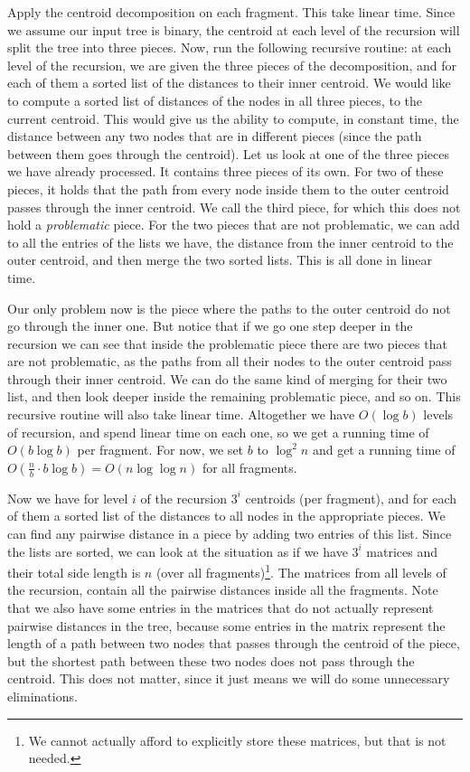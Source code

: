 \documentclass[11pt,a4paper]{article}
\theoremstyle{definition}
\theoremstyle{remark}
\begin{document}
Apply the centroid decomposition on each fragment. This take linear time. Since we assume our input tree is binary, the centroid at each level of the recursion will split the tree into three pieces. Now, run the following recursive routine: at each level of the recursion, we are given the three pieces of the decomposition, and for each of them a sorted list of the distances to their inner centroid. We would like to compute a sorted list of distances of the nodes in all three pieces, to the current centroid. This would give us the ability to compute, in constant time, the distance between any two nodes that are in different pieces (since the path between them goes through the centroid). Let us look at one of the three pieces we have already processed. It contains three pieces of its own. For two of these pieces, it holds that the path from every node inside them to the outer centroid passes through the inner centroid. We call the third piece, for which this does not hold a \textit{problematic} piece. For the two pieces that are not problematic, we can add to all the entries of the lists we have, the distance from the inner centroid to the outer centroid, and then merge the two sorted lists. This is all done in linear time.

Our only problem now is the piece where the paths to the outer centroid do not go through the inner one. But notice that if we go one step deeper in the recursion we can see that inside the problematic piece there are two pieces that are not problematic, as the paths from all their nodes to the outer centroid pass through their inner centroid. We can do the same kind of merging for their two list, and then look deeper inside the remaining problematic piece, and so on. This recursive routine will also take linear time. Altogether we have $O(\log b)$ levels of recursion, and spend linear time on each one, so we get a running time of $O(b \log b)$ per fragment. For now, we set $b$ to $\log ^2 n$ and get a running time of $O(\frac{n}{b} \cdot b\log b) = O(n \log \log n)$ for all fragments.

Now we have for level $i$ of the recursion $3^i$ centroids (per fragment), and for each of them a sorted list of the distances to all nodes in the appropriate pieces. We can find any pairwise distance in a piece by adding two entries of this list. Since the lists are sorted, we can look at the situation as if we have $3^i$ matrices and their total side length is $n$ (over all fragments)\footnote{We cannot actually afford to explicitly store these matrices, but that is not needed.}. The matrices from all levels of the recursion, contain all the pairwise distances inside all the fragments. Note that we also have some entries in the matrices that do not actually represent pairwise distances in the tree, because some entries in the matrix represent the length of a path between two nodes that passes through the centroid of the piece, but the shortest path between these two nodes does not pass through the centroid. This does not matter, since it just means we will do some unnecessary eliminations.
\end{document}
